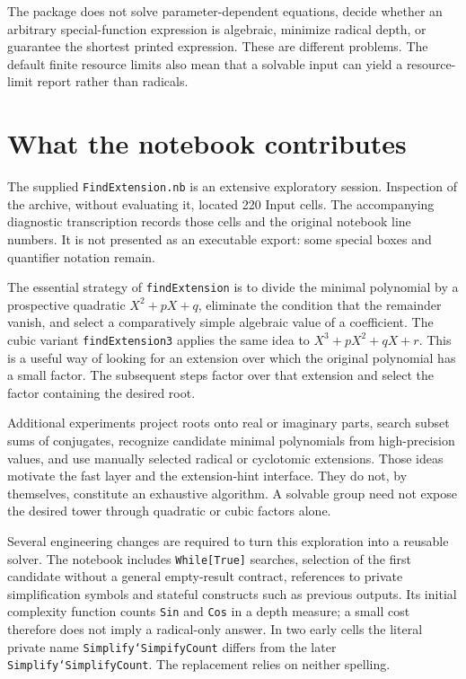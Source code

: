 \documentclass[11pt,letterpaper]{article}
\newcommand{\code}[1]{\texttt{#1}}
\theoremstyle{definition}\newtheorem{definition}[theorem]{Definition}
\theoremstyle{remark}\newtheorem{remark}[theorem]{Remark}
\begin{document}
The package does not solve parameter-dependent equations, decide whether an
arbitrary special-function expression is algebraic, minimize radical depth,
or guarantee the shortest printed expression. These are different problems.
The default finite resource limits also mean that a solvable input can yield
a resource-limit report rather than radicals.

\section{What the notebook contributes}

The supplied \code{FindExtension.nb} is an extensive exploratory session.
Inspection of the archive, without evaluating it, located 220 Input cells.
The accompanying diagnostic transcription records those cells and the
original notebook line numbers. It is not presented as an executable export:
some special boxes and quantifier notation remain.

The essential strategy of \code{findExtension} is to divide the minimal
polynomial by a prospective quadratic
\(X^2+pX+q\), eliminate the condition that the remainder vanish, and select
a comparatively simple algebraic value of a coefficient. The cubic variant
\code{findExtension3} applies the same idea to
\(X^3+pX^2+qX+r\). This is a useful way of looking for an extension over which
the original polynomial has a small factor. The subsequent steps factor
over that extension and select the factor containing the desired root.

Additional experiments project roots onto real or imaginary parts, search
subset sums of conjugates, recognize candidate minimal polynomials from
high-precision values, and use manually selected radical or cyclotomic
extensions. Those ideas motivate the fast layer and the extension-hint
interface. They do not, by themselves, constitute an exhaustive algorithm.
A solvable group need not expose the desired tower through quadratic or
cubic factors alone.

Several engineering changes are required to turn this exploration into a
reusable solver. The notebook includes \code{While[True]} searches, selection
of the first candidate without a general empty-result contract, references
to private simplification symbols and stateful constructs such as previous
outputs. Its initial complexity function counts \code{Sin} and \code{Cos}
in a depth measure; a small cost therefore does not imply a radical-only
answer. In two early cells the literal private name
\code{Simplify`SimpifyCount} differs from the later
\code{Simplify`SimplifyCount}. The replacement relies on neither spelling.
\end{document}
